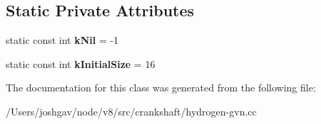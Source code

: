 \subsection*{Static Private Attributes}
\begin{DoxyCompactItemize}
\item 
static const int {\bfseries k\+Nil} = -\/1\hypertarget{classv8_1_1internal_1_1_h_instruction_map_a4e807fa1d149d5a8b5c0a78b0fc0af18}{}\label{classv8_1_1internal_1_1_h_instruction_map_a4e807fa1d149d5a8b5c0a78b0fc0af18}

\item 
static const int {\bfseries k\+Initial\+Size} = 16\hypertarget{classv8_1_1internal_1_1_h_instruction_map_a5a11c62be72b6e403863ea8613a06ad2}{}\label{classv8_1_1internal_1_1_h_instruction_map_a5a11c62be72b6e403863ea8613a06ad2}

\end{DoxyCompactItemize}


The documentation for this class was generated from the following file\+:\begin{DoxyCompactItemize}
\item 
/\+Users/joshgav/node/v8/src/crankshaft/hydrogen-\/gvn.\+cc\end{DoxyCompactItemize}
